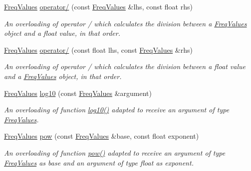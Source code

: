 \begin{DoxyCompactItemize}
\mbox{\label{structFreqValues_a392b5ed122a4deafa3ba773f4829c20a}} 
\hyperlink{structFreqValues}{Freq\+Values} \hyperlink{structFreqValues_a392b5ed122a4deafa3ba773f4829c20a}{operator/} (const \hyperlink{structFreqValues}{Freq\+Values} \&lhs, const float rhs)
\begin{DoxyCompactList}\small\item\em An overloading of operator / which calculates the division between a {\itshape \hyperlink{structFreqValues}{Freq\+Values}} object and a {\itshape float} value, in that order. \end{DoxyCompactList}\item 
\mbox{\label{structFreqValues_aed1d809f52aa8f6da3afa2af8a45d288}} 
\hyperlink{structFreqValues}{Freq\+Values} \hyperlink{structFreqValues_aed1d809f52aa8f6da3afa2af8a45d288}{operator/} (const float lhs, const \hyperlink{structFreqValues}{Freq\+Values} \&rhs)
\begin{DoxyCompactList}\small\item\em An overloading of operator / which calculates the division between a {\itshape float} value and a {\itshape \hyperlink{structFreqValues}{Freq\+Values}} object, in that order. \end{DoxyCompactList}\item 
\mbox{\label{structFreqValues_a90781867604621a99e59d4fcdc4a5f38}} 
\hyperlink{structFreqValues}{Freq\+Values} \hyperlink{structFreqValues_a90781867604621a99e59d4fcdc4a5f38}{log10} (const \hyperlink{structFreqValues}{Freq\+Values} \&argument)
\begin{DoxyCompactList}\small\item\em An overloading of function {\ttfamily \hyperlink{structFreqValues_a90781867604621a99e59d4fcdc4a5f38}{log10()}} adapted to receive an argument of type {\itshape \hyperlink{structFreqValues}{Freq\+Values}}. \end{DoxyCompactList}\item 
\mbox{\label{structFreqValues_a8b8ee90b9d108ad7008a3613b31253e7}} 
\hyperlink{structFreqValues}{Freq\+Values} \hyperlink{structFreqValues_a8b8ee90b9d108ad7008a3613b31253e7}{pow} (const \hyperlink{structFreqValues}{Freq\+Values} \&base, const float exponent)
\begin{DoxyCompactList}\small\item\em An overloading of function {\ttfamily \hyperlink{structFreqValues_a8b8ee90b9d108ad7008a3613b31253e7}{pow()}} adapted to receive an argument of type {\itshape \hyperlink{structFreqValues}{Freq\+Values}} as base and an argument of type {\itshape float} as exponent. \end{DoxyCompactList}\item 

\end{DoxyCompactItemize}

